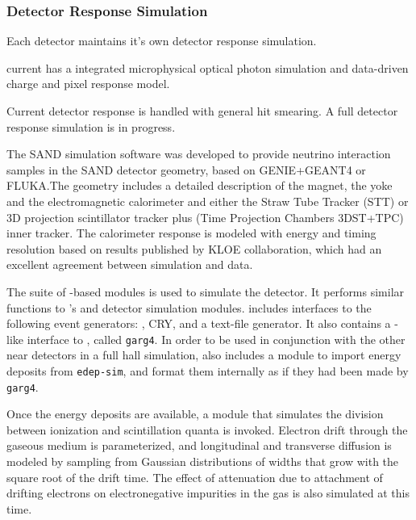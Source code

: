 \documentclass[../main-v1.tex]{subfiles}
\begin{document}
\subsubsection{Detector Response Simulation}

Each detector maintains it's own detector response simulation. 

 current has a integrated microphysical optical photon simulation and data-driven charge and pixel response model. 

Current detector response is handled with general hit smearing. A full detector response simulation is in progress. 

The SAND simulation software was developed to provide neutrino interaction samples in the SAND detector geometry, based on  GENIE+GEANT4 or FLUKA.The geometry includes a detailed description of the magnet, the yoke and the electromagnetic calorimeter and either the Straw Tube Tracker (STT) or 3D projection scintillator tracker plus (Time Projection Chambers 3DST+TPC) inner tracker. The calorimeter response is modeled  with energy and timing resolution based on results published by KLOE collaboration,
which had an excellent agreement between simulation and data.

\label{sec:usecases_ndgardetsim}

The  suite of -based modules is used to simulate the  detector.  It performs similar functions to 's  and detector simulation modules.   includes interfaces to the following event generators:  , CRY, and a text-file generator.  It also contains a -like interface to , called {\tt garg4}.  In order to be used in conjunction with the other near detectors in a full hall simulation,  also includes a module to import energy deposits from {\tt edep-sim}, and format them internally as if they had been made by {\tt garg4}.

Once the energy deposits are available, a module that simulates the division between ionization and scintillation quanta is invoked.  Electron drift through the gaseous medium is parameterized, and longitudinal and transverse diffusion is modeled by sampling from Gaussian distributions of widths that grow with the square root of the drift time.  The effect of attenuation due to attachment of drifting electrons on electronegative impurities in the gas is also simulated at this time. 
\end{document}
